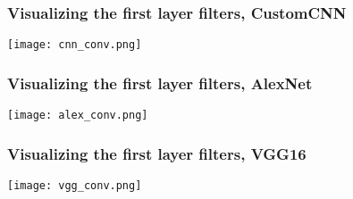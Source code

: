 \documentclass[../presentation.tex]{subfiles} %
\begin{document}
\begin{frame}
    \frametitle{Visualizing the first layer filters, CustomCNN}
    \begin{center}
        \texttt{[image: cnn\_conv.png]}
    \end{center}
\end{frame}

\begin{frame}
    \frametitle{Visualizing the first layer filters, AlexNet}
    \begin{center}
        \texttt{[image: alex\_conv.png]}
    \end{center}
\end{frame}

\begin{frame}
    \frametitle{Visualizing the first layer filters, VGG16}
    \begin{center}
        \texttt{[image: vgg\_conv.png]}
    \end{center}
\end{frame}
\end{document}
